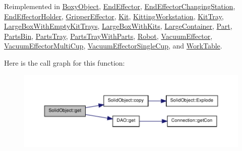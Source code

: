 Reimplemented in \hyperlink{class_boxy_object_aaa4e45e5c3f830a1c0e942a8dc56e913}{BoxyObject}, \hyperlink{class_end_effector_ad46cf6320eb6ee331316a14b1095e8d8}{EndEffector}, \hyperlink{class_end_effector_changing_station_a74afe5e584a48413753dec5415f33773}{EndEffectorChangingStation}, \hyperlink{class_end_effector_holder_aaf0dbf799f0b9fd3e572d771ab57486a}{EndEffectorHolder}, \hyperlink{class_gripper_effector_ade0d2f1e5e0a61d1550ffcc305eae11e}{GripperEffector}, \hyperlink{class_kit_a0aac0cbf2762b9592a123a8b7beae7c2}{Kit}, \hyperlink{class_kitting_workstation_a5f5afa0d30bf06607f8146b7ae891ca2}{KittingWorkstation}, \hyperlink{class_kit_tray_af0877c7a86b0991789a065024aa2d064}{KitTray}, \hyperlink{class_large_box_with_empty_kit_trays_a453605c27e575c642c58f1650e4331d3}{LargeBoxWithEmptyKitTrays}, \hyperlink{class_large_box_with_kits_a34913d976cf733ddd6bcce7b2a69f2f0}{LargeBoxWithKits}, \hyperlink{class_large_container_a980f922e2d6f582e29bca54bf6c66a21}{LargeContainer}, \hyperlink{class_part_ab6dcd5abea7f0c70934fd70051054d7b}{Part}, \hyperlink{class_parts_bin_acc390b70050f1074a4ff25b9f4ad9ef1}{PartsBin}, \hyperlink{class_parts_tray_a6e725e36cbe03d114ff4c1bad5acda98}{PartsTray}, \hyperlink{class_parts_tray_with_parts_a6fe375e6b1f71fd27becc9ad1cfd5983}{PartsTrayWithParts}, \hyperlink{class_robot_a79bf7a499a3860c351abf981b8e19fbf}{Robot}, \hyperlink{class_vacuum_effector_a7424e643d7c5440e7f988c2321b78c20}{VacuumEffector}, \hyperlink{class_vacuum_effector_multi_cup_a414494076a456ad84adf4784e1c216d7}{VacuumEffectorMultiCup}, \hyperlink{class_vacuum_effector_single_cup_a5ae1745edb7c88858b86df5d3f74297c}{VacuumEffectorSingleCup}, and \hyperlink{class_work_table_a72e440916d93fddc774eb1e941564d0f}{WorkTable}.



Here is the call graph for this function:\nopagebreak
\begin{figure}[H]
\begin{center}
\leavevmode
\includegraphics[width=400pt]{class_solid_object_afb027c9baf0d811d6f376abc10501ac9_cgraph}
\end{center}
\end{figure}


